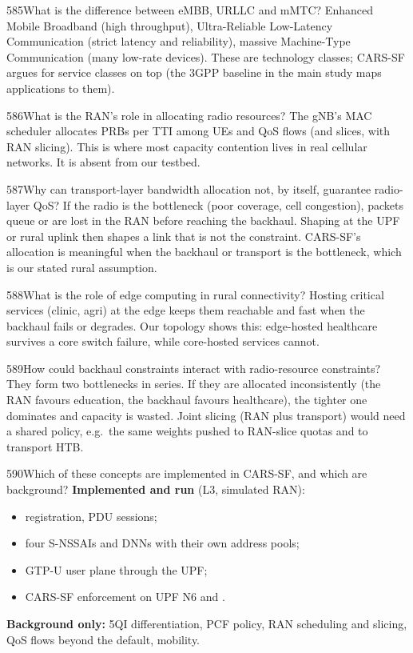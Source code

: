 \begin{qa}{585}{What is the difference between eMBB, URLLC and mMTC?}
Enhanced Mobile Broadband (high throughput), Ultra-Reliable Low-Latency Communication (strict latency and
reliability), massive Machine-Type Communication (many low-rate devices). These are technology classes; CARS-SF argues
for service classes on top (the 3GPP baseline in the main study maps applications to them).
\end{qa}

\begin{qa}{586}{What is the RAN's role in allocating radio resources?}
The gNB's MAC scheduler allocates PRBs per TTI among UEs and QoS flows (and slices, with RAN slicing). This is where
most capacity contention lives in real cellular networks. It is absent from our testbed.
\end{qa}

\begin{qa}{587}{Why can transport-layer bandwidth allocation not, by itself, guarantee radio-layer QoS?}
If the radio is the bottleneck (poor coverage, cell congestion), packets queue or are lost in the RAN before reaching
the backhaul. Shaping at the UPF or rural uplink then shapes a link that is not the constraint. CARS-SF's allocation is
meaningful when the backhaul or transport is the bottleneck, which is our stated rural assumption.
\end{qa}

\begin{qa}{588}{What is the role of edge computing in rural connectivity?}
Hosting critical services (clinic, agri) at the edge keeps them reachable and fast when the backhaul fails or degrades.
Our topology shows this: edge-hosted healthcare survives a core switch failure, while core-hosted services cannot.
\end{qa}

\begin{qa}{589}{How could backhaul constraints interact with radio-resource constraints?}
They form two bottlenecks in series. If they are allocated inconsistently (the RAN favours education, the backhaul
favours healthcare), the tighter one dominates and capacity is wasted. Joint slicing (RAN plus transport) would need a
shared policy, e.g.\ the same weights pushed to RAN-slice quotas and to transport HTB.
\end{qa}

\begin{qa}{590}{Which of these concepts are implemented in CARS-SF, and which are background?}
\textbf{Implemented and run} (L3, simulated RAN):
\begin{itemize}
\item registration, PDU sessions;
\item four S-NSSAIs and DNNs with their own address pools;
\item GTP-U user plane through the UPF;
\item CARS-SF enforcement on UPF N6 and .
\end{itemize}
\textbf{Background only:} 5QI differentiation, PCF policy, RAN scheduling and slicing, QoS flows beyond the default,
mobility.
\end{qa}

